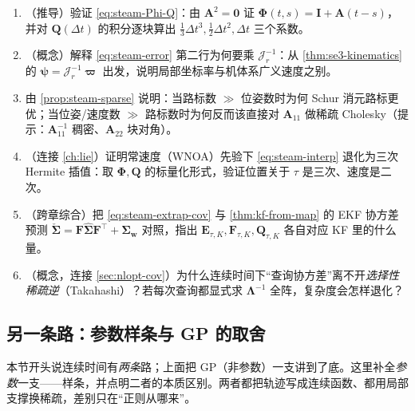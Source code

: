\begin{practice}
\begin{enumerate}
  \item （推导）验证 \cref{eq:steam-Phi-Q}：由 $\mathbf{A}^2=\mathbf{0}$ 证 $\boldsymbol{\Phi}(t,s)=\mathbf{I}+\mathbf{A}(t-s)$，并对 $\mathbf{Q}(\Delta t)$ 的积分逐块算出 $\tfrac13\Delta t^3,\tfrac12\Delta t^2,\Delta t$ 三个系数。
  \item （概念）解释 \cref{eq:steam-error} 第二行为何要乘 $\boldsymbol{\mathcal{J}}_r^{-1}$：从 \cref{thm:se3-kinematics} 的 $\boldsymbol{\psi}=\boldsymbol{\mathcal{J}}_r^{-1}\boldsymbol{\varpi}$ 出发，说明局部坐标率与机体系广义速度之别。
  \item 由 \cref{prop:steam-sparse} 说明：当路标数 $\gg$ 位姿数时为何 Schur 消元路标更优；当位姿/速度数 $\gg$ 路标数时为何反而该直接对 $\mathbf{A}_{11}$ 做稀疏 Cholesky（提示：$\mathbf{A}_{11}^{-1}$ 稠密、$\mathbf{A}_{22}$ 块对角）。
  \item （连接 \cref{ch:lie}）证明常速度（WNOA）先验下 \cref{eq:steam-interp} 退化为三次 Hermite 插值：取 $\boldsymbol{\Phi},\mathbf{Q}$ 的标量化形式，验证位置关于 $\tau$ 是三次、速度是二次。
  \item （跨章综合）把 \cref{eq:steam-extrap-cov} 与 \cref{thm:kf-from-map} 的 EKF 协方差预测 $\check{\boldsymbol{\Sigma}}=\mathbf{F}\hat{\boldsymbol{\Sigma}}\mathbf{F}^\top+\boldsymbol{\Sigma}_{\mathbf{w}}$ 对照，指出 $\mathbf{E}_{\tau,K},\mathbf{F}_{\tau,K},\mathbf{Q}_{\tau,K}$ 各自对应 KF 里的什么量。
  \item （概念，连接 \cref{sec:nlopt-cov}）为什么连续时间下“查询协方差”离不开\emph{选择性稀疏逆}（Takahashi）？若每次查询都显式求 $\boldsymbol{\Lambda}^{-1}$ 全阵，复杂度会怎样退化？
\end{enumerate}
\end{practice}

\subsection{另一条路：参数样条与 GP 的取舍}
\label{sec:est-steam-spline}

本节开头说连续时间有\emph{两条}路；上面把 GP（非参数）一支讲到了底。这里补全\emph{参数}一支——样条，并点明二者的本质区别。两者都把轨迹写成连续函数、都用局部支撑换稀疏，差别只在“正则从哪来”。

